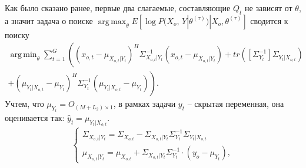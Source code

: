 \documentclass[11pt]{article}
\DeclareMathOperator*{\argmax}{arg\,max}
\DeclareMathOperator*{\argmin}{arg\,min}
\begin{document}
Как было сказано ранее, первые два слагаемые, составляющие $Q_t$ не зависят от $\theta$, а значит задача о поиске $\argmax_{\theta} E[\log P(X_o, \, Y|\theta^{(\tau)})|X_o, \theta^{(\tau)}] $ сводится к поиску
\begin{equation}
\begin{gathered}
\argmin_{\theta}  \sum_{t=1}^G \left((x_{o,t}-\mu_{X_{o,t}|Y_t})^H\Sigma_{X_{o,t}|Y_t}^{-1}(x_{o,t}-\mu_{X_{o,t}|Y_t}) +  tr([\Sigma_{Y_t}^{-1}]\Sigma_{Y_t|X_{o,t}}) \right. \\ \left. +  (\mu_{Y_t|X_{o,t}}-\mu_{Y_t})^H\Sigma_{Y_t}^{-1}(\mu_{Y_t|X_{o,t}}-\mu_{Y_t})\right).
\end{gathered}
\end{equation}
Учтем, что $\mu_{Y_t} = O_{(M+L_2) \times 1}$, в рамках задачи $y_t$ -- скрытая переменная, она оценивается так: $\hat{y}_t = \mu_{Y_t|X_{o,t}}$.
\begin{equation}
\left\{ \begin{gathered} 
\Sigma_{X_{o,t}|Y_t} = \Sigma_{X_{o,t}}-\Sigma_{X_{o,t}|Y_t}\Sigma_{Y_t}^{-1}\Sigma_{Y_t|X_{o,t}} \\
\mu_{X_{o,t}|Y_t} = \mu_{X_{o,t}} + \Sigma_{X_{o,t}|Y_t}\Sigma_{Y_t}^{-1}\cdot(y_o-\mu_{Y_t}),
\end{gathered} \right.
\end{equation}
\end{document}
